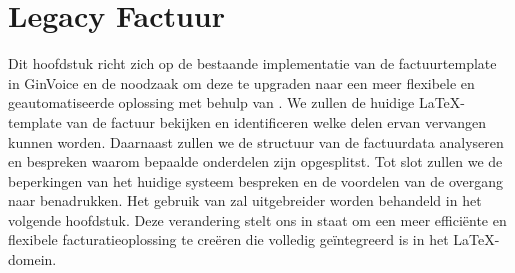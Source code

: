 \section{Legacy Factuur}

Dit hoofdstuk richt zich op de bestaande implementatie van de factuurtemplate in GinVoice en de noodzaak om deze te upgraden naar een meer flexibele en geautomatiseerde oplossing met behulp van .
We zullen de huidige \LaTeX-template van de factuur bekijken en identificeren welke delen ervan vervangen kunnen worden.
Daarnaast zullen we de structuur van de factuurdata analyseren en bespreken waarom bepaalde onderdelen zijn opgesplitst.
Tot slot zullen we de beperkingen van het huidige systeem bespreken en de voordelen van de overgang naar  benadrukken.
Het gebruik van  zal uitgebreider worden behandeld in het volgende hoofdstuk.
Deze verandering stelt ons in staat om een meer efficiënte en flexibele facturatieoplossing te creëren die volledig geïntegreerd is in het LaTeX-domein.

